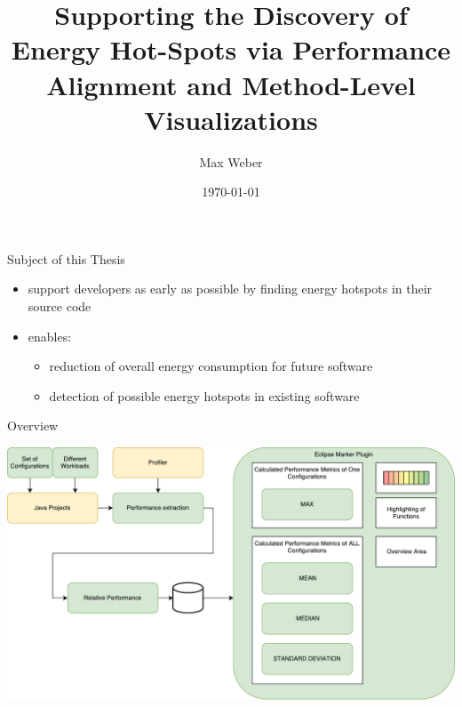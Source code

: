 \documentclass[11pt,aspectratio=169]{beamer}
\title[Green Development]{Supporting the Discovery of Energy Hot-Spots via Performance Alignment and Method-Level Visualizations}
\author[M. Weber]{Max Weber}
\institute[Bauhaus-Universität Weimar]{}
\date[\today]{\today}
\begin{document}

\maketitle



\begin{frame}{Subject of this Thesis}
  \begin{itemize}
    \item support developers as early as possible by finding energy hotspots in their source code
    \item enables:
    \begin{itemize}
      \item reduction of overall energy consumption for future software
      \item detection of possible energy hotspots in existing software
    \end{itemize}
  \end{itemize}
\end{frame}


\begin{frame}{Overview}
  \begin{center}
    \includegraphics[height=0.83\textheight]{./images/Workflow_Green_DEV_0.pdf}
  \end{center}
\end{frame}
\end{document}
